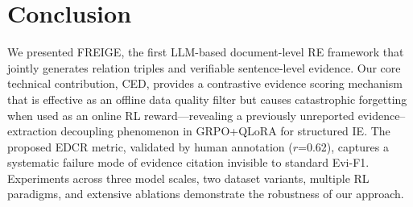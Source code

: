 \documentclass[11pt,a4paper]{article}
\newcommand{\method}{FREIGE}
\newcommand{\ced}{CED}
\newcommand{\edcr}{EDCR}
\begin{document}
\section{Conclusion}
\label{sec:conclusion}

We presented \method{}, the first LLM-based document-level RE framework that jointly generates relation triples and verifiable sentence-level evidence.
Our core technical contribution, \ced{}, provides a contrastive evidence scoring mechanism that is effective as an offline data quality filter but causes catastrophic forgetting when used as an online RL reward---revealing a previously unreported evidence--extraction decoupling phenomenon in GRPO+QLoRA for structured IE.
The proposed \edcr{} metric, validated by human annotation ($r$=0.62), captures a systematic failure mode of evidence citation invisible to standard Evi-F1.
Experiments across three model scales, two dataset variants, multiple RL paradigms, and extensive ablations demonstrate the robustness of our approach.
\end{document}
